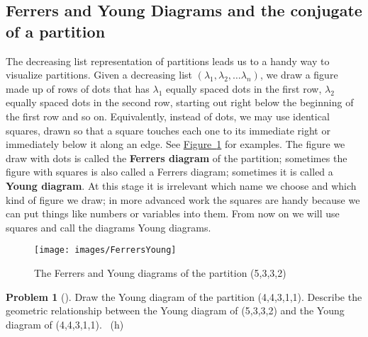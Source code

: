 \documentclass[10pt,]{book}
\newcommand{\terminology}[1]{\textbf{#1}}
\theoremstyle{plain}
\theoremstyle{definition}
\newtheorem{activity}[project]{Problem}
\theoremstyle{definition}
\numberwithin{equation}{chapter}
\begin{document}
\subsection[{Ferrers and Young Diagrams and the conjugate of a partition}]{Ferrers and Young Diagrams and the conjugate of a partition}\label{subsection-38}
\hypertarget{p-906}{}%
The decreasing list representation of partitions leads us to a handy way to visualize partitions. Given a decreasing list \((\lambda_1,\lambda_2,\ldots \lambda_n)\), we draw a figure made up of rows of dots that has \(\lambda_1\) equally spaced dots in the first row, \(\lambda_2\) equally spaced dots in the second row, starting out right below the beginning of the first row and so on. Equivalently, instead of dots, we may use identical squares, drawn so that a square touches each one to its immediate right or immediately below it along an edge. See \hyperref[FerrersYoung]{Figure~\ref{FerrersYoung}} for examples. The figure we draw with dots is called the \terminology{Ferrers diagram} of the partition; sometimes the figure with squares is also called a Ferrers diagram; sometimes it is called a \terminology{Young diagram}. At this stage it is irrelevant which name we choose and which kind of figure we draw; in more advanced work the squares are handy because we can put things like numbers or variables into them.  From now on we will use squares and call the diagrams Young diagrams.%
\begin{figure}
\centering
\texttt{[image: images/FerrersYoung]}
\caption{The Ferrers and Young diagrams of the partition (5,3,3,2)\label{FerrersYoung}}
\end{figure}
\begin{activity}[] \label{activity-163}
\hypertarget{p-907}{}%
Draw the Young diagram of the partition (4,4,3,1,1). Describe the geometric relationship between the Young diagram of (5,3,3,2) and the Young diagram of (4,4,3,1,1).%
~{\tiny (h)}\end{activity}
\end{document}
